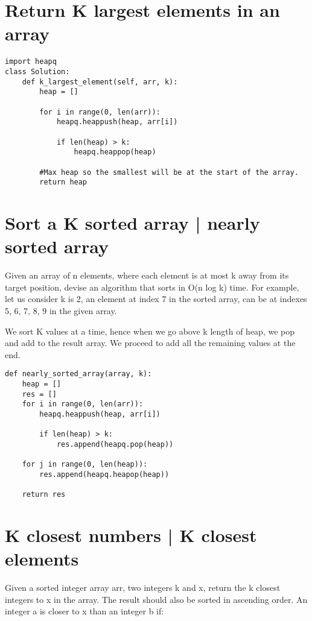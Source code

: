\documentclass[24pt, a4]{article}
\begin{document}
\newpage

\section{Return K largest elements in an array}
\begin{lstlisting}
import heapq
class Solution:
    def k_largest_element(self, arr, k):
        heap = []

        for i in range(0, len(arr)):
            heapq.heappush(heap, arr[i])

            if len(heap) > k:
                heapq.heappop(heap)
                
        #Max heap so the smallest will be at the start of the array.
        return heap
\end{lstlisting}

\section{Sort a K sorted array | nearly sorted array}
Given an array of n elements, where each element is at most k away from its 
target position, devise an algorithm that sorts in O(n log k) time. For 
example, let us consider k is 2, an element at index 7 in the sorted array, 
can be at indexes 5, 6, 7, 8, 9 in the given array.

We sort K values at a time, hence when we go above k length of heap, we pop and
add to the result array. We proceed to add all the remaining values at the end.

\begin{lstlisting}
def nearly_sorted_array(array, k):
    heap = []
    res = []
    for i in range(0, len(arr)):
        heapq.heappush(heap, arr[i])
        
        if len(heap) > k:
            res.append(heapq.pop(heap))
            
    for j in range(0, len(heap)):
        res.append(heapq.heapop(heap))
    
    return res
\end{lstlisting}

\newpage
\section{K closest numbers | K closest elements}
Given a sorted integer array arr, two integers k and x, return the k closest 
integers to x in the array. The result should also be sorted in ascending 
order. An integer a is closer to x than an integer b if:
\end{document}
